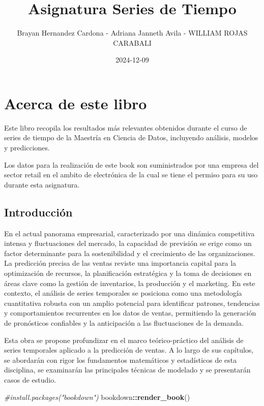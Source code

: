 \documentclass[
]{book}
\title{Asignatura Series de Tiempo}
\author{Brayan Hernandez Cardona - Adriana Janneth Avila - WILLIAM ROJAS CARABALI}
\date{2024-12-09}
\newenvironment{Shaded}{\begin{snugshade}}{\end{snugshade}}
\newcommand{\CommentTok}[1]{\textcolor[rgb]{0.56,0.35,0.01}{\textit{#1}}}
\newcommand{\FunctionTok}[1]{\textcolor[rgb]{0.13,0.29,0.53}{\textbf{#1}}}
\newcommand{\NormalTok}[1]{#1}
\newcommand{\SpecialCharTok}[1]{\textcolor[rgb]{0.81,0.36,0.00}{\textbf{#1}}}
\begin{document}
\maketitle

{
\setcounter{tocdepth}{1}
\tableofcontents
}
\chapter{Acerca de este libro}\label{acerca-de-este-libro}

Este libro recopila los resultados más relevantes obtenidos durante el curso de series de tiempo de la Maestría en Ciencia de Datos, incluyendo análisis, modelos y predicciones.

Los datos para la realización de este book son suministrados por una empresa del sector retail en el ambito de electrónica de la cual se tiene el permiso para su uso durante esta asignatura.

\section{Introducción}\label{introducciuxf3n}

En el actual panorama empresarial, caracterizado por una dinámica competitiva intensa y fluctuaciones del mercado, la capacidad de previsión se erige como un factor determinante para la sostenibilidad y el crecimiento de las organizaciones. La predicción precisa de las ventas reviste una importancia capital para la optimización de recursos, la planificación estratégica y la toma de decisiones en áreas clave como la gestión de inventarios, la producción y el marketing. En este contexto, el análisis de series temporales se posiciona como una metodología cuantitativa robusta con un amplio potencial para identificar patrones, tendencias y comportamientos recurrentes en los datos de ventas, permitiendo la generación de pronósticos confiables y la anticipación a las fluctuaciones de la demanda.

Esta obra se propone profundizar en el marco teórico-práctico del análisis de series temporales aplicado a la predicción de ventas. A lo largo de sus capítulos, se abordarán con rigor los fundamentos matemáticos y estadísticos de esta disciplina, se examinarán las principales técnicas de modelado y se presentarán casos de estudio.

\begin{Shaded}
\begin{Highlighting}[]
\CommentTok{\#install.packages("bookdown")}
\NormalTok{bookdown}\SpecialCharTok{::}\FunctionTok{render\_book}\NormalTok{()}
\end{Highlighting}
\end{Shaded}
\end{document}
